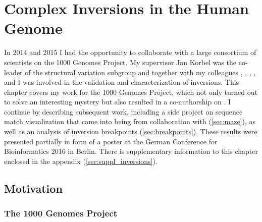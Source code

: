 \chapter{Complex Inversions in the Human Genome}
\label{sec:complex_invs}


In 2014 and 2015 I had the opportunity to collaborate with a large consortium of
scientists on the 1000 Genomes Project. My supervisor Jan Korbel was the
co-leader of the structural variation subgroup and together with my colleagues
\tobias, \adrian, \benjamin, \markus, and \andreas
I was involved in the validation and characterization of inversions.
This chapter covers my work for the 1000 Genomes Project, which not only turned
out to solve an interesting mystery but also resulted in a co-authorship on
\cite{Sudmant2015}. I continue by describing subsequent work, including a side
project on sequence match visualization that came into being from collaboration
with \markus (\cref{sec:maze}), as well as an analysis of inversion breakpoints
(\cref{sec:breakpoints}). These results were presented partially in form of a
poster at the German Conference for
Bioinformatics 2016 in Berlin. There is supplementary information to this
chapter enclosed in the appendix (\cref{sec:suppl_inversions}).





\section{Motivation}
\subsection{The 1000 Genomes Project}
\label{sec:1000G}

